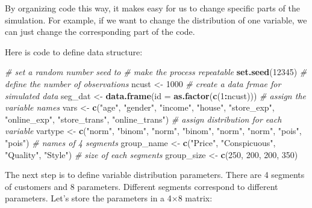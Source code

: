 \documentclass[12pt,]{krantz}
\makeatletter
\newenvironment{Shaded}{\begin{snugshade}}{\end{snugshade}}
\newcommand{\CommentTok}[1]{\textcolor[rgb]{0.37,0.37,0.37}{\textit{#1}}}
\newcommand{\DataTypeTok}[1]{\textcolor[rgb]{0.27,0.27,0.27}{#1}}
\newcommand{\DecValTok}[1]{\textcolor[rgb]{0.06,0.06,0.06}{#1}}
\newcommand{\KeywordTok}[1]{\textcolor[rgb]{0.27,0.27,0.27}{\textbf{#1}}}
\newcommand{\NormalTok}[1]{#1}
\newcommand{\OperatorTok}[1]{\textcolor[rgb]{0.43,0.43,0.43}{\textbf{#1}}}
\newcommand{\StringTok}[1]{\textcolor[rgb]{0.5,0.5,0.5}{#1}}
\newenvironment{kframe}{%
\medskip{}
\setlength{\fboxsep}{.8em}
 \def\at@end@of@kframe{}%
 \ifinner\ifhmode%
  \def\at@end@of@kframe{\end{minipage}}%
  \begin{minipage}{\columnwidth}%
 \fi\fi%
 \def\FrameCommand##1{\hskip\@totalleftmargin \hskip-\fboxsep
 \colorbox{shadecolor}{##1}\hskip-\fboxsep
     \hskip-\linewidth \hskip-\@totalleftmargin \hskip\columnwidth}%
 \MakeFramed {\advance\hsize-\width
   \@totalleftmargin\z@ \linewidth\hsize
   \@setminipage}}%
 {\par\unskip\endMakeFramed%
 \at@end@of@kframe}
\renewenvironment{Shaded}{\begin{kframe}}{\end{kframe}}
\makeatother
\begin{document}
By organizing code this way, it makes easy for us to change specific parts of the simulation. For example, if we want to change the distribution of one variable, we can just change the corresponding part of the code.

Here is code to define data structure:

\begin{Shaded}
\begin{Highlighting}[]
\CommentTok{# set a random number seed to }
\CommentTok{# make the process repeatable}
\KeywordTok{set.seed}\NormalTok{(}\DecValTok{12345}\NormalTok{)}
\CommentTok{# define the number of observations}
\NormalTok{ncust <-}\StringTok{ }\DecValTok{1000}
\CommentTok{# create a data frmae for simulated data}
\NormalTok{seg_dat <-}\StringTok{ }\KeywordTok{data.frame}\NormalTok{(}\DataTypeTok{id =} \KeywordTok{as.factor}\NormalTok{(}\KeywordTok{c}\NormalTok{(}\DecValTok{1}\OperatorTok{:}\NormalTok{ncust)))}
\CommentTok{# assign the variable names}
\NormalTok{vars <-}\StringTok{ }\KeywordTok{c}\NormalTok{(}\StringTok{"age"}\NormalTok{, }\StringTok{"gender"}\NormalTok{, }\StringTok{"income"}\NormalTok{, }\StringTok{"house"}\NormalTok{, }\StringTok{"store_exp"}\NormalTok{, }
    \StringTok{"online_exp"}\NormalTok{, }\StringTok{"store_trans"}\NormalTok{, }\StringTok{"online_trans"}\NormalTok{)}
\CommentTok{# assign distribution for each variable}
\NormalTok{vartype <-}\StringTok{ }\KeywordTok{c}\NormalTok{(}\StringTok{"norm"}\NormalTok{, }\StringTok{"binom"}\NormalTok{, }\StringTok{"norm"}\NormalTok{, }\StringTok{"binom"}\NormalTok{, }\StringTok{"norm"}\NormalTok{, }\StringTok{"norm"}\NormalTok{, }
    \StringTok{"pois"}\NormalTok{, }\StringTok{"pois"}\NormalTok{)}
\CommentTok{# names of 4 segments}
\NormalTok{group_name <-}\StringTok{ }\KeywordTok{c}\NormalTok{(}\StringTok{"Price"}\NormalTok{, }\StringTok{"Conspicuous"}\NormalTok{, }\StringTok{"Quality"}\NormalTok{, }\StringTok{"Style"}\NormalTok{)}
\CommentTok{# size of each segments}
\NormalTok{group_size <-}\StringTok{ }\KeywordTok{c}\NormalTok{(}\DecValTok{250}\NormalTok{, }\DecValTok{200}\NormalTok{, }\DecValTok{200}\NormalTok{, }\DecValTok{350}\NormalTok{)}
\end{Highlighting}
\end{Shaded}

The next step is to define variable distribution parameters. There are 4 segments of customers and 8 parameters. Different segments correspond to different parameters. Let's store the parameters in a 4×8 matrix:
\end{document}
